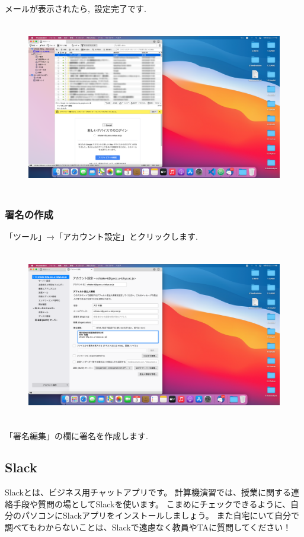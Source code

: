 \documentclass{jarticle}
\begin{document}
\newpage
メールが表示されたら,\ 設定完了です.\ 
\begin{figure}[H]
  \centering
  \includegraphics[height=7.5cm]{fig/MacThunderbird6.png}
\end{figure}

\subsubsection{署名の作成}
「ツール」→「アカウント設定」とクリックします.\ 
\begin{figure}[H]
  \centering
  \includegraphics[height=7.5cm]{fig/MacThunderbird7.png}
\end{figure}
「署名編集」の欄に署名を作成します.\ 

\subsection{Slack}
Slackとは、ビジネス用チャットアプリです。
計算機演習では、授業に関する連絡手段や質問の場としてSlackを使います。
こまめにチェックできるように、自分のパソコンにSlackアプリをインストールしましょう。
また自宅にいて自分で調べてもわからないことは、Slackで遠慮なく教員やTAに質問してください！
\end{document}
